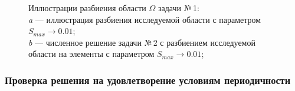\documentclass[12pt, a4paper]{article}
\begin{document}
\begin{figure}[h]
\begin{center}
				\end{center} 
				\vspace*{-0.0mm} 
				\caption{Иллюстрации разбиения области $\Omega$ задачи №\,1:\\
					\textit{a} --- иллюстрация разбиения исследуемой области с параметром $S_{max} \rightarrow 0.01$; \\
					\textit{b} --- численное решение задачи №\,2 с разбиением исследуемой области на  элементы с параметром $S_{max} \rightarrow 0.01$; \\
				} 
			\end{figure}
			\vspace*{-10mm}
			\subsubsection{Проверка решения на удовлетворение условиям периодичности}
			
\end{document}
